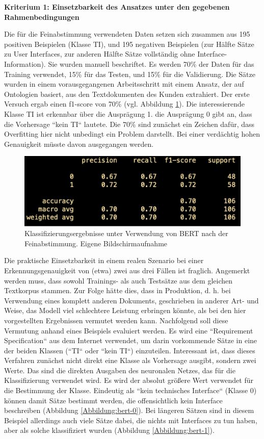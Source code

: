 {\bf Kriterium 1: Einsetzbarkeit des Ansatzes unter den gegebenen Rahmenbedingungen}

Die für die Feinabstimmung verwendeten Daten setzen sich zusammen aus 195 positiven Beispielen (Klasse TI), und 195 negativen Beispielen (zur Hälfte Sätze zu User Interfaces, zur anderen Hälfte Sätze vollständig ohne Interface-Information). Sie wurden manuell beschriftet. Es werden 70\% der Daten für das Training verwendet, 15\% für das Testen, und 15\% für die Validierung. Die Sätze wurden in einem vorausgegangenen Arbeitsschritt mit einem Ansatz, der auf Ontologien basiert, aus den Textdokumenten des Kunden extrahiert. Der erste Versuch ergab einen f1-score von 70\% (vgl. Abbildung \ref{Abbildung:bert-confusion}). Die interessierende Klasse TI ist erkennbar über die Ausprägung 1. die Ausprägung 0 gibt an, dass die Vorhersage ``kein TI`` lautete. Die 70\% sind zunächst ein Zeichen dafür, dass Overfitting hier nicht unbedingt ein Problem darstellt. Bei einer verdächtig hohen Genauigkeit müsste davon ausgegangen werden.
 
\begin{figure}[h]
\centering
\includegraphics[scale=0.95]{content/pics/Picture_23.png}
\caption{Klassifizierungsergebnisse unter Verwendung von BERT nach der Feinabstimmung. Eigene Bildschirmaufnahme}
\label{Abbildung:bert-confusion}
\end{figure}

Die praktische Einsetzbarkeit in einem realen Szenario bei einer Erkennungsgenauigkeit von (etwa) zwei aus drei Fällen ist fraglich. Angemerkt werden muss, dass sowohl Trainings- als auch Testsätze aus dem gleichen Textkorpus stammen. Zur Folge hätte dies, dass in Produktion, d. h. bei Verwendung eines komplett anderen Dokuments, geschrieben in anderer Art- und Weise, das Modell viel schlechtere Leistung erbringen könnte, als bei den hier vorgestellten Ergebnissen vermutet werden kann. Nachfolgend soll diese Vermutung anhand eines Beispiels evaluiert werden. Es wird eine ``Requirement Specification`` aus dem Internet verwendet, um darin vorkommende Sätze in eine der beiden Klassen (``TI`` oder ``kein TI``) einzuteilen. Interessant ist, dass dieses Verfahren zunächst nicht direkt eine Klasse als Vorhersage ausgibt, sondern zwei Werte. Das sind die direkten Ausgaben des neuronalen Netzes, das für die Klassifizierung verwendet wird. Es wird der absolut größere Wert verwendet für die Bestimmung der Klasse. Eindeutig als ``kein technisches Interface`` (Klasse 0) können damit Sätze bestimmt werden, die offensichtlich kein Interface beschreiben (Abbildung \ref{Abbildung:bert-0}). Bei längeren Sätzen sind in diesem Beispiel allerdings auch viele Sätze dabei, die nichts mit Interfaces zu tun haben, aber als solche klassifiziert wurden (Abbildung \ref{Abbildung:bert-1}).

